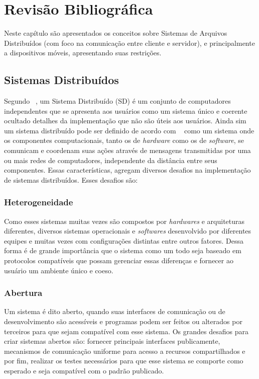\chapter{Revisão Bibliográfica}

Neste capítulo são apresentados os conceitos sobre Sistemas de Arquivos Distribuídos (com foco na comunicação entre cliente e servidor), e principalmente a dispositivos móveis, apresentando suas restrições.


\section{Sistemas Distribuídos}

    Segundo ~\cite{tanenbaum}, um Sistema Distribuído (SD) é um conjunto de computadores independentes que se apresenta aos usuários como um sistema único e coerente ocultado detalhes da implementação que não são úteis aos usuários. Ainda sim um sistema distribuído pode ser definido de acordo com ~\cite{coulouris} como um sistema onde os componentes computacionais, tanto os de \textit{hardware} como os de \textit{software}, se comunicam e coordenam suas ações através de mensagens transmitidas por uma ou mais redes de computadores, independente da distância entre seus componentes. Essas características, agregam diversos desafios na implementação de sistemas distribuídos. Esses desafios são:
    
    \subsection{Heterogeneidade}
        Como esses sistemas muitas vezes são compostos por \textit{hardwares} e arquiteturas diferentes, diversos sistemas operacionais e \textit{softwares} desenvolvido por diferentes equipes e muitas vezes com configurações distintas
        entre outros fatores. Dessa forma é de grande importância que o sistema como um todo seja baseado em protocolos compatíveis que possam gerenciar essas diferenças e fornecer ao usuário um ambiente único e coeso.
    
    \subsection{Abertura}
        Um sistema é dito aberto, quando suas interfaces de comunicação ou de desenvolvimento são acessíveis e programas podem ser feitos ou alterados por terceiros para que sejam compatível com esse sistema. Os grandes desafios para criar sistemas abertos são: fornecer principais interfaces publicamente, mecanismos de comunicação uniforme para acesso a recursos compartilhados e por fim, realizar os testes necessários para que esse sistema se comporte como esperado e seja compatível com o padrão publicado.
    
